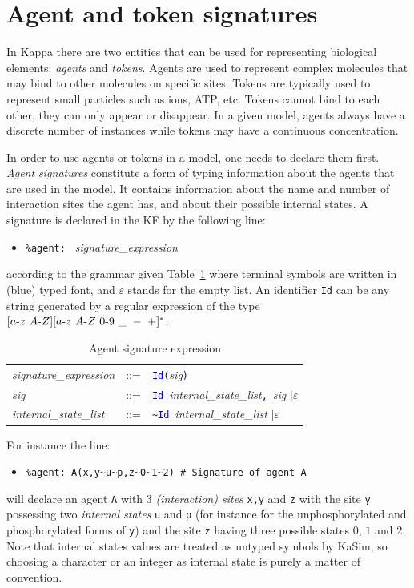 \documentclass[11pt]{book}
\def\KaSim{\textsf{KaSim}}
\def\sep{\hbox{-}}
\def\intstate{\textasciitilde}
\def\tcb#1{\textcolor{blue}{\ttt{#1}}}
\def\ttt#1{\texttt{#1}}
\def\ITE#1{\begin{itemize}#1\end{itemize}}
\def\imp#1{\emph{#1}\index{#1}}
\begin{document}
\section{Agent and token signatures}\label{sec:sig}
%
In Kappa there are two entities that can be used for representing biological elements: \imp{agents} and \imp{tokens}.  Agents are used to represent complex molecules that may bind to other molecules on specific sites. Tokens are typically used to represent small particles such as ions, ATP, etc. Tokens cannot bind to each other, they can only appear or disappear. In a given model, agents always have a discrete number of instances while tokens may have a continuous concentration.

In order to use agents or tokens in a model, one needs to declare them first. \emph{Agent signatures} constitute a form of typing information about the agents that are used in the model. It contains information about the name and number of interaction sites the agent has, and about their possible internal states. A signature is declared in the KF by the following line:
\ITE{
\item[] \ttt{\%agent: } \textit{signature\_expression}
}
according to the grammar given Table~\ref{tab:sig} where terminal symbols are written in (blue) typed font, and $\varepsilon$ stands for the empty list. An identifier
 \ttt{Id} can be any string generated by a regular expression of the type $[a\sep z\ A\sep Z][a\sep z\ A \sep Z\ 0\sep 9\ \_ \ -\ +]^*$. 
\begin{table}[htbp]
  \centering
  \caption{Agent signature expression}
  \begin{tabular}{@{} lcl @{}}
    \textit{signature\_expression} & ::= & \tcb{Id}\tcb{(}\textit{sig}\tcb{)} \\ 
    \textit{sig} & ::= & \tcb{Id}~\textit{internal\_state\_list}\tcb{,}\ \textit{sig} $\mid\varepsilon$ \\ 
    \textit{internal\_state\_list} & ::= & \tcb{\intstate Id}~\textit{internal\_state\_list} $\mid\varepsilon$ 
    \end{tabular}
  \label{tab:sig}
\end{table}

For instance the line:
\ITE{
\item[] \ttt{\%agent: A(x,y\intstate u\intstate p,z\intstate 0\intstate 1\intstate 2) \# Signature of agent A}
}
will declare an agent \ttt{A} with 3 \emph{(interaction) sites} \ttt{x,y} and \ttt{z} with the site \ttt{y} possessing two \emph{internal states} \ttt{u} and \ttt{p} (for instance for the unphosphorylated and phosphorylated forms of \ttt{y}) and the site \ttt{z} having three possible states $0$, $1$ and $2$. Note that internal states values are treated as untyped symbols by \KaSim, so choosing a character or an integer as internal state is purely a matter of convention. 
\end{document}
